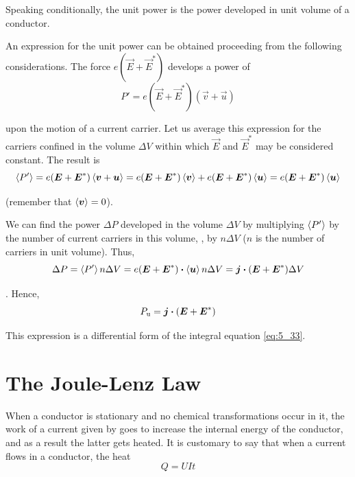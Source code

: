\noindent
Speaking conditionally, the unit power is the power developed in unit volume of a conductor.

An expression for the unit power can be obtained proceeding from the following considerations. The force $e(\vec{E}+\vec{E}^*)$ develops a power of
\begin{equation*}
    P' = e (\vec{E} + \vec{E}^*) (\vec{v} + \vec{u})
\end{equation*}

\noindent
upon the motion of a current carrier. Let us average this expression for the carriers confined in the volume $\Delta{V}$ within which $\vec{E}$ and $\vec{E}^*$ may be considered constant. The result is
\begin{equation*}
    \left\langle P' \right\rangle = e (\boldsymbol{E} + \boldsymbol{E}^*) \left\langle \boldsymbol{v} + \boldsymbol{u} \right\rangle = e (\boldsymbol{E} + \boldsymbol{E}^*) \left\langle \boldsymbol{v} \right\rangle + e (\boldsymbol{E} + \boldsymbol{E}^*) \left\langle \boldsymbol{u} \right\rangle = e (\boldsymbol{E} + \boldsymbol{E}^*) \left\langle \boldsymbol{u} \right\rangle
\end{equation*}

\noindent
(remember that $\left\langle \boldsymbol{v} \right\rangle=0$).

We can find the power $\Delta{P}$ developed in the volume $\Delta{V}$ by multiplying $\left\langle P' \right\rangle$ by the number of current carriers in this volume, \ie, by $n\Delta{V}$ ($n$ is the number of carriers in unit volume). Thus,
\begin{equation*}
    \Delta{P} = \left\langle P' \right\rangle n \Delta{V} = e (\boldsymbol{E} + \boldsymbol{E}^*) \boldsymbol{\cdot} \left\langle \boldsymbol{u} \right\rangle n \Delta{V} = \boldsymbol{j} \boldsymbol{\cdot} (\boldsymbol{E} + \boldsymbol{E}^*) \Delta{V}
\end{equation*}

. Hence,
\begin{equation}\label{eq:5_35}
    P_{\text{u}} = \boldsymbol{j} \boldsymbol{\cdot} (\boldsymbol{E} + \boldsymbol{E}^*)
\end{equation}

\noindent
This expression is a differential form of the integral equation \eqref{eq:5_33}.

\section{The Joule-Lenz Law}\label{sec:5_8}

When a conductor is stationary and no chemical transformations occur in it, the work of a current given by  goes to increase the internal energy of the conductor, and as a result the latter gets heated. It is customary to say that when a current flows in a conductor, the heat
\begin{equation*}
    Q = U I t
\end{equation*}

